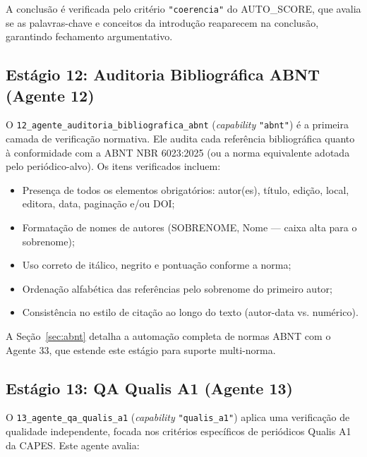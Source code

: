 A conclusão é verificada pelo critério \texttt{"coerencia"} do
AUTO\_SCORE, que avalia se as palavras-chave e conceitos da
introdução reaparecem na conclusão, garantindo fechamento
argumentativo.

\subsection{Estágio 12: Auditoria Bibliográfica ABNT (Agente 12)}
\label{sec:estagio12}

O \texttt{12\_agente\_auditoria\_bibliografica\_abnt}
(\textit{capability} \texttt{"abnt"}) é a primeira camada de
verificação normativa. Ele audita cada referência bibliográfica
quanto à conformidade com a ABNT NBR 6023:2025 (ou a norma
equivalente adotada pelo periódico-alvo). Os itens verificados
incluem:

\begin{itemize}
    \item Presença de todos os elementos obrigatórios: autor(es),
    título, edição, local, editora, data, paginação e/ou DOI;

    \item Formatação de nomes de autores (SOBRENOME, Nome —
    caixa alta para o sobrenome);

    \item Uso correto de itálico, negrito e pontuação conforme a
    norma;

    \item Ordenação alfabética das referências pelo sobrenome do
    primeiro autor;

    \item Consistência no estilo de citação ao longo do texto
    (autor-data vs. numérico).
\end{itemize}

A Seção~\ref{sec:abnt} detalha a automação completa de normas ABNT
com o Agente 33, que estende este estágio para suporte
multi-norma.

\subsection{Estágio 13: QA Qualis A1 (Agente 13)}
\label{sec:estagio13}

O \texttt{13\_agente\_qa\_qualis\_a1}
(\textit{capability} \texttt{"qualis\_a1"}) aplica uma verificação
de qualidade independente, focada nos critérios específicos de
periódicos Qualis A1 da CAPES. Este agente avalia:

